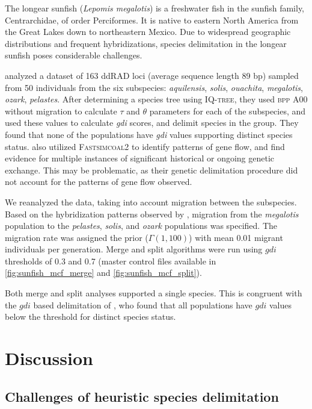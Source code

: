 \documentclass[A4]{article1}
\begin{document}
The longear sunfish (\textit{Lepomis megalotis}) is a freshwater fish in the sunfish
family, Centrarchidae, of order Perciformes.  It is native to eastern North America from
the Great Lakes down to northeastern Mexico.  Due to widespread geographic distributions
and frequent hybridizations, species delimitation in the longear sunfish poses
considerable challenges. 

\citet{Kim2022} analyzed a dataset of 163 ddRAD loci (average
sequence length 89 bp) sampled from 50 individuals from the six subspecies:
\textit{aquilensis}, \textit{solis}, \textit{ouachita}, \textit{megalotis},
\textit{ozark}, \textit{pelastes}.  After determining a species tree using
\textsc{IQ-tree}, they used \textsc{bpp} A00 without migration to calculate $\tau$ and
$\theta$ parameters for each of the subspecies, and used these values to calculate
\textit{gdi} scores, and delimit species in the group. They found that none of the populations have \textit{gdi} values supporting distinct species status. \citet{Kim2022} also utilized \textsc{Fastsimcoal2} to identify patterns
of gene flow, and find evidence for multiple instances of significant historical or
ongoing genetic exchange.  This may be problematic, as their genetic delimitation procedure
did not account for the patterns of gene flow observed.

We reanalyzed the data, taking into account migration between the subspecies.  Based on the hybridization patterns observed by \cite{Kim2022}, migration from the \textit{megalotis} population to
the \textit{pelastes}, \textit{solis}, and \textit{ozark} populations was specified. The migration rate was assigned
the prior ($\Gamma (1,100)$) with mean 0.01 migrant individuals per generation. Merge and split algorithms were run using $gdi$
thresholds of 0.3 and 0.7 (master control files available in \ref{fig:sunfish_mcf_merge} and \ref{fig:sunfish_mcf_split}).

Both merge and split analyses supported a single species.  This is congruent with the $gdi$
based delimitation of \citet{Kim2022}, who found that all populations have $gdi$ values
below the threshold for distinct species status.


\newpage
\section{Discussion}

\subsection{Challenges of heuristic species delimitation}
\end{document}
